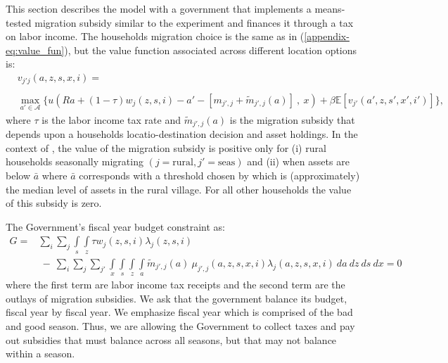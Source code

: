 \documentclass[12pt,pdftex]{article}
\begin{document}
This section describes the model with a government that implements a means-tested migration subsidy similar to the \citet{brch14} experiment and finances it through a tax on labor income. The households migration choice is the same as in (\ref{appendix-eq:value_fun}), but the value function associated across different location options is:
\begin{align}
& v_{j'j}(a, z,  s, x, i) = \nonumber \\
\nonumber \\
& \max_{a'\in \mathcal{A}}\bigg  \{ u(Ra + (1 - \tau)w_{j}(z, s, i) - a' - [m_{j',j} + \tilde{m}_{j',j}(a)] \ , \  x)  + \beta \mathbb{E} [v_{j'}(a', z, s', x', i')]  \bigg\},
\label{appendix-eq:value_fun_tax}
\end{align}
where $\tau$ is the labor income tax rate and $\tilde{m}_{j',j}(a)$ is the migration subsidy that depends upon a households locatio-destination decision and asset holdings. In the context of \citet{brch14}, the value of the migration subsidy is positive only for (i) rural households seasonally migrating $(j = \mbox{rural}, j' = \mbox{seas})$ and (ii) when assets are below $\bar a$ where $\bar a$ corresponds with a threshold chosen by \citet{brch14} which is (approximately) the median level of assets in the rural village. For all other households the value of this subsidy is zero.

The Government's fiscal year budget constraint as:
{\small
\begin{align}
G =& \sum_{i} \sum_{j} \int\limits_{s} \int\limits_{z} \tau  w_{j}(z,s,i)\lambda_j(z,s,i)  \nonumber \\
& \ - \ \sum_{i} \sum_{j}\sum_{j'} \int\limits_{x} \int\limits_{s} \int\limits_{z} \int\limits_{a} \tilde{m}_{j',j}(a) \ \mu_{j',j}(a, z, s, x, i) \lambda_j(a, z, s, x, i) \ da \ dz \ ds \ dx  = 0
\label{appendix-eq:gov_budget}
\end{align}}where the first term are labor income tax receipts and the second term are the outlays of migration subsidies. We ask that the government balance its budget, fiscal year by fiscal year. We emphasize fiscal year which is comprised of the bad and good season. Thus, we are allowing the Government to collect taxes and pay out subsidies that must balance across all seasons, but that may not balance within a season.
\end{document}
